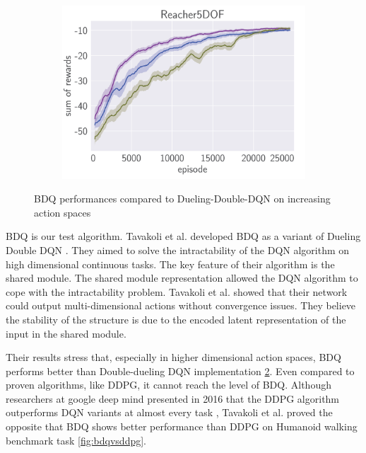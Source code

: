 \begin{figure}[htbp]
    \hspace*{\fill}   %
    \begin{subfigure}{0.31\textwidth}
      \includegraphics[width=\linewidth]{figures/BDQ3.png}
      \caption{} \label{fig:1b}
    \end{subfigure}%

\caption{BDQ performances compared to Dueling-Double-DQN on increasing action spaces \label{fig:BDQvsDDQN}}
\end{figure}

BDQ is our test algorithm. Tavakoli et al. developed BDQ as a variant of Dueling Double DQN \cite{Tavakoli2018}. They aimed to solve the intractability of the DQN algorithm on high dimensional continuous tasks. The key feature of their algorithm is the shared module. The shared module representation allowed the DQN algorithm to cope with the intractability problem. Tavakoli et al. showed that their network could output multi-dimensional actions without convergence issues. They believe the stability of the structure is due to the encoded latent representation of the input in the shared module.

Their results stress that, especially in higher dimensional action spaces, BDQ performs better than Double-dueling DQN implementation \ref{fig:BDQvsDDQN}. Even compared to proven algorithms, like DDPG, it cannot reach the level of BDQ. Although researchers at google deep mind presented in 2016 that the DDPG algorithm outperforms DQN variants at almost every task \cite{Lillicrap2016}, Tavakoli et al. proved the opposite that BDQ shows better performance than DDPG on Humanoid walking benchmark task \ref{fig:bdqvsddpg}.


